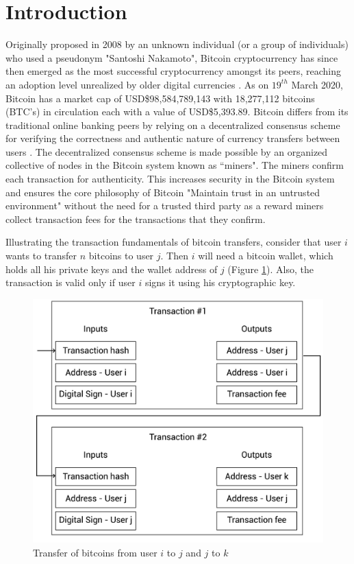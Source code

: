 \documentclass[preprint,12pt]{elsarticle}
\begin{document}
\linenumbers


\section{Introduction}
Originally proposed in 2008 by an unknown individual (or a group of individuals) who used a pseudonym "Santoshi Nakamoto", Bitcoin cryptocurrency has since then emerged as the most successful cryptocurrency amongst its peers, reaching an adoption level unrealized by older digital currencies \cite{park2019nodes, FENG201945, WANG201943}. As on $19^{th}$ March 2020, Bitcoin has a market cap of USD\$98,584,789,143 with 18,277,112 bitcoins (BTC's) in circulation each with a value of USD\$5,393.89. Bitcoin differs from its traditional online banking peers by relying on a decentralized consensus scheme for verifying the correctness and authentic nature of currency transfers between users \cite{rahouti2018bitcoin, nakamoto2019bitcoin, AGGARWAL201913}. The decentralized consensus scheme is made possible by an organized collective of nodes in the Bitcoin system known as ``miners". The miners confirm each transaction for authenticity. This increases security in the Bitcoin system and ensures the core philosophy of Bitcoin "Maintain trust in an untrusted environment" without the need for a trusted third party as a reward miners collect transaction fees for the transactions that they confirm. 

Illustrating the transaction fundamentals of bitcoin transfers, consider that user $i$ wants to transfer $n$ bitcoins to user $j$. Then $i$ will need a bitcoin wallet, which holds all his private keys and the wallet address of $j$ (Figure \ref{bit-transfer}). Also, the transaction is valid only if user $i$ signs it using his cryptographic key. 

\begin{figure}[!h]
\centering\includegraphics[width=0.5\linewidth]{3.png}
\caption{Transfer of bitcoins from user $i$ to $j$ and $j$ to $k$}
\label{bit-transfer}
\end{figure}
\end{document}
